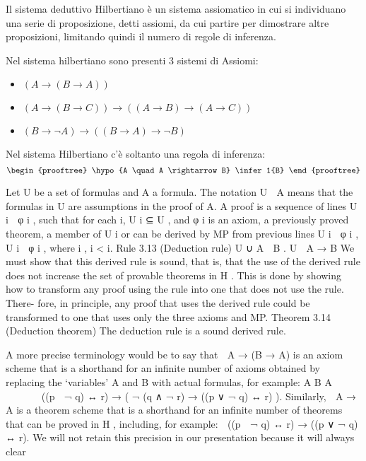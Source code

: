 Il sistema deduttivo Hilbertiano è un sistema assiomatico in cui si individuano
una serie di proposizione, detti assiomi, da cui partire per dimostrare altre proposizioni,
limitando quindi il numero di regole di inferenza.

Nel sistema hilbertiano sono presenti 3 sistemi di Assiomi:
\begin{itemize}
    \item $(A \rightarrow (B \rightarrow A))$
    \item $(A \rightarrow (B \rightarrow C)) \rightarrow ((A \rightarrow B) \rightarrow (A \rightarrow C))$
    \item $(B \rightarrow \neg A) \rightarrow ((B \rightarrow A) \rightarrow \neg B)$
\end{itemize}
Nel sistema Hilbertiano c'è soltanto una regola di inferenza:
\begin{equation*}
\begin{prooftree}
\hypo{A \quad A \rightarrow B}
\infer1{B}
\end{prooftree}
\end{equation*}

Let U be a set of formulas and A a formula. The notation U 
A means that the formulas in U are assumptions in the proof of A. A proof is a
sequence of lines U i  φ i , such that for each i, U i ⊆ U , and φ i is an axiom, a
previously proved theorem, a member of U i or can be derived by MP from previous
lines U i  φ i , U i  φ i , where i , i < i.
Rule 3.13 (Deduction rule)
U ∪ {A}  B
.
U  A → B
We must show that this derived rule is sound, that is, that the use of the derived
rule does not increase the set of provable theorems in H . This is done by showing
how to transform any proof using the rule into one that does not use the rule. There-
fore, in principle, any proof that uses the derived rule could be transformed to one
that uses only the three axioms and MP.
Theorem 3.14 (Deduction theorem) The deduction rule is a sound derived rule.

A more precise terminology would be to say that  A → (B → A)
is an axiom scheme that is a shorthand for an infinite number of axioms obtained by
replacing the ‘variables’ A and B with actual formulas, for example:
A
B
A



  



((p ∨ ¬ q) ↔ r) → ( ¬ (q ∧ ¬ r) → ((p ∨ ¬ q) ↔ r) ).
Similarly,  A → A is a theorem scheme that is a shorthand for an infinite number
of theorems that can be proved in H , including, for example:
 ((p ∨ ¬ q) ↔ r) → ((p ∨ ¬ q) ↔ r).
We will not retain this precision in our presentation because it will always clear


